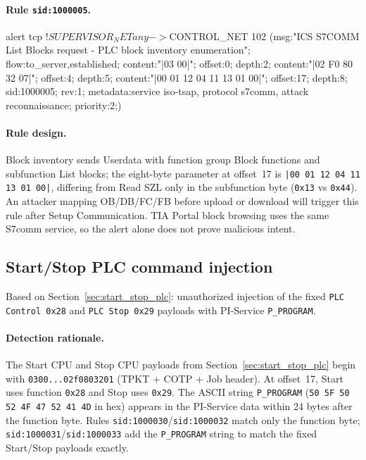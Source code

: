\documentclass[../main.tex]{subfiles}
\begin{document}
\paragraph{Rule \texttt{sid:1000005}.}
\begin{packetdump}
alert tcp !$SUPERVISOR_NET any -> $CONTROL_NET 102 (msg:"ICS S7COMM List Blocks request - PLC block
  inventory enumeration"; flow:to_server,established; content:"|03 00|";
  offset:0; depth:2; content:"|02 F0 80 32 07|"; offset:4; depth:5;
  content:"|00 01 12 04 11 13 01 00|"; offset:17; depth:8; sid:1000005; rev:1;
  metadata:service iso-tsap, protocol s7comm, attack reconnaissance; priority:2;)
\end{packetdump}

\paragraph{Rule design.}
Block inventory sends Userdata with function group Block functions and subfunction List blocks; the eight-byte parameter at offset~17 is \texttt{|00 01 12 04 11 13 01 00|}, differing from Read SZL only in the subfunction byte (\texttt{0x13} vs \texttt{0x44}). An attacker mapping OB/DB/FC/FB before upload or download will trigger this rule after Setup Communication. TIA Portal block browsing uses the same S7comm service, so the alert alone does not prove malicious intent.

\subsection{Start/Stop PLC command injection}
\label{sec:rules-start-stop}

Based on Section~\ref{sec:start_stop_plc}: unauthorized injection of the fixed \texttt{PLC Control 0x28} and \texttt{PLC Stop 0x29} payloads with PI-Service \texttt{P\_PROGRAM}.

\paragraph{Detection rationale.}
The Start CPU and Stop CPU payloads from Section~\ref{sec:start_stop_plc} begin with \texttt{0300...02f0803201} (TPKT + COTP + Job header). At offset~17, Start uses function \texttt{0x28} and Stop uses \texttt{0x29}. The ASCII string \texttt{P\_PROGRAM} (\texttt{50 5F 50 52 4F 47 52 41 4D} in hex) appears in the PI-Service data within 24 bytes after the function byte. Rules \texttt{sid:1000030}/\texttt{sid:1000032} match only the function byte; \texttt{sid:1000031}/\texttt{sid:1000033} add the \texttt{P\_PROGRAM} string to match the fixed Start/Stop payloads exactly.
\end{document}
